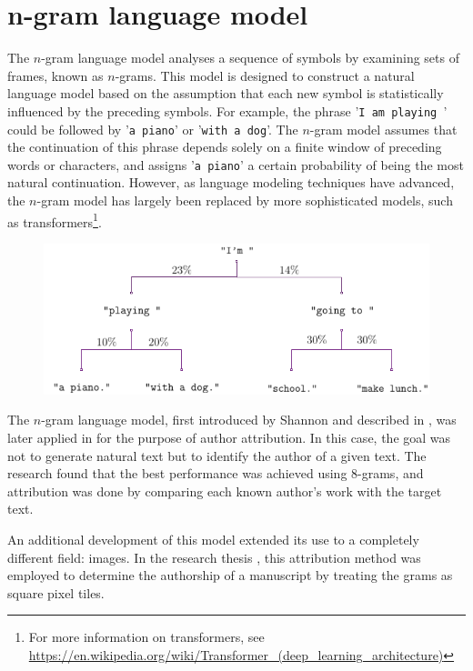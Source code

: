 \section{n-gram language model}
The $n$-gram language model analyses a sequence of symbols by examining sets of frames, known as $n$-grams. This model is designed to construct a natural language model based on the assumption that each new symbol is statistically influenced by the preceding symbols. For example, the phrase '\texttt{I am playing }' could be followed by '\texttt{a piano}' or '\texttt{with a dog}'. The $n$-gram model assumes that the continuation of this phrase depends solely on a finite window of preceding words or characters, and assigns '\texttt{a piano}' a certain probability of being the most natural continuation. However, as language modeling techniques have advanced, the $n$-gram model has largely been replaced by more sophisticated models, such as transformers\footnote{For more information on transformers, see \url{https://en.wikipedia.org/wiki/Transformer_(deep_learning_architecture)}}.

\begin{figure}[ht]
	\centering
	\includegraphics[width=\linewidth]{Figures/exngrammodel.png}
\end{figure}

\noindent The $n$-gram language model, first introduced by Shannon and described in \citet{Shannon_ngrammodel}, was later applied in \citet{SapAttribution} for the purpose of author attribution. In this case, the goal was not to generate natural text but to identify the author of a given text. The research found that the best performance was achieved using $8$-grams, and attribution was done by comparing each known author's work with the target text.

\noindent An additional development of this model extended its use to a completely different field: images. In the research thesis \cite{thesis}, this attribution method was employed to determine the authorship of a manuscript by treating the grams as square pixel tiles.

